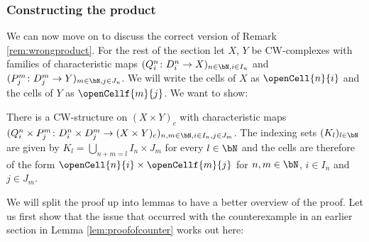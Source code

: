 \subsubsection*{Constructing the product}\label{sec:constructproduct}

We can now move on to discuss the correct version of Remark \ref{rem:wrongproduct}. 
For the rest of the section let $X$, $Y$ be CW-complexes with families of characteristic maps $(Q_i^n \colon D_i^n \to X)_{n \in \bN, i \in I_n}$ and $(P_j^m \colon D_j^m \to Y)_{m \in \bN, j \in J_n}$. We will write the cells of $X$ as $\openCell{n}{i}$ and the cells of $Y$ as $\openCellf{m}{j}$.
We want to show:

\begin{thm}\label{thm:productcw}
    There is a CW-structure on $(X \times Y)_c$ with characteristic maps $(Q_i^n \times P_j^m \colon D_i^n \times D_j^m \to (X \times Y)_c)_{n,m \in \bN,i \in I_n,j \in J_m}$.
    The indexing sets $(K_l)_{l \in \bN}$ are given by $K_l = \bigcup_{n + m = l}I_n \times J_m$ for every $l \in \bN$ and the cells are therefore of the form $\openCell{n}{i} \times \openCellf{m}{j}$ for $n, m \in \bN$, $i \in I_n$ and $j \in J_m$.
\end{thm}

We will split the proof up into lemmas to have a better overview of the proof. 
Let us first show that the issue that occurred with the counterexample in an earlier section in Lemma \ref{lem:proofofcounter} works out here:

